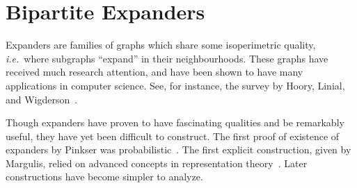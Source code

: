 







\section{Bipartite Expanders}

Expanders are families of graphs which share some isoperimetric
quality, \emph{i.e.}~where subgraphs ``expand'' in their
neighbourhoods. These graphs have received much research attention,
and have been shown to have many applications in computer
science. See, for instance, the survey by Hoory, Linial, and
Wigderson~\cite{hoory.linial.ea:expander}.

Though expanders have proven to have fascinating qualities and be
remarkably useful, they have yet been difficult to construct. The
first proof of existence of expanders by Pinkser was
probabilistic~\cite{pinsker:on}. The first explicit construction,
given by Margulis, relied on advanced concepts in representation
theory~\cite{margulis:explicit}. Later constructions have become
simpler to analyze.

